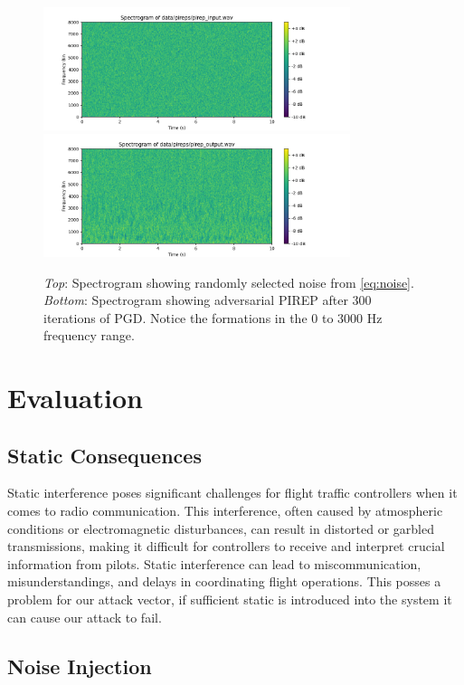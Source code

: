 \documentclass[11pt,a4paper]{article}
\begin{document}
\begin{figure}
  \centering
  \includegraphics[width=0.8\textwidth]{images/pirep_input.png}
  \includegraphics[width=0.8\textwidth]{images/pirep_output.png}
  \caption{\textit{Top}: Spectrogram showing randomly selected noise from \autoref{eq:noise}. \textit{Bottom}: Spectrogram showing adversarial PIREP after 300 iterations of PGD. Notice the formations in the 0 to 3000 Hz frequency range.}
  \label{fig:spectrograms}
\end{figure}

\section{Evaluation}

\subsection{Static Consequences}

Static interference poses significant challenges for flight traffic controllers
when it comes to radio communication. This interference, often caused by
atmospheric conditions or electromagnetic disturbances, can result in distorted
or garbled transmissions, making it difficult for controllers to receive and
interpret crucial information from pilots. Static interference can lead to
miscommunication, misunderstandings, and delays in coordinating flight
operations. This posses a problem for our attack vector, if sufficient static is
introduced into the system it can cause our attack to fail.

\subsection{Noise Injection}
\label{sec:noise_injection}
\end{document}
